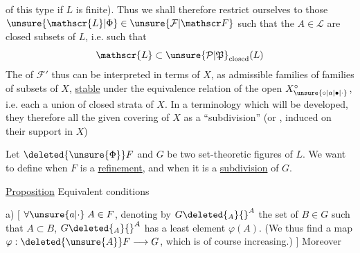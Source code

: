 of this type if $L$ is finite). Thus we shall therefore restrict ourselves to those $\unsure{\mathscr{L}|\Phi}\in\unsure{\mathcal F|\mathscr F}$ such that the $A\in\mathscr{L}$ are closed subsets of $L$, i.e. such that
\[ \mathscr{L}\subset\unsure{\mathcal P|\mathfrak P}_{\text{closed}}(L) \]
The  of $\mathcal F'$ thus  can be interpreted in terms of $X$, as admissible families  of families of
 subsets of $X$,  \uline{stable} under the equivalence relation of the open   $X_{\unsure{\circ|a|\bullet|\cdot}}^\circ$, i.e. each a union of closed strata of $X$.
In a terminology which will be developed, they therefore all  the given covering of $X$ as a ``subdivision''\unsure{;|,} (or ,  induced on their support in $X$)


Let $\deleted{\unsure{\Phi}}F$ and $G$ be two set-theoretic figures of $L$. We want to define when $F$ is a \uline{refinement}, and when it is a \uline{subdivision} of $G$.

\uline{Proposition} Equivalent conditions

a) $[$ $\forall\unsure{a|\cdot}\;A\in F$, denoting by $G\deleted{{}_A}{}^A$ the set of $B\in G$ such that $A\subset B$, $G\deleted{{}_A}{}^A$ has a least
element $\varphi(A)$. (We thus find a map $\varphi:\deleted{\unsure{A}}F\longrightarrow G$, which is of course increasing.) $]$ Moreover
